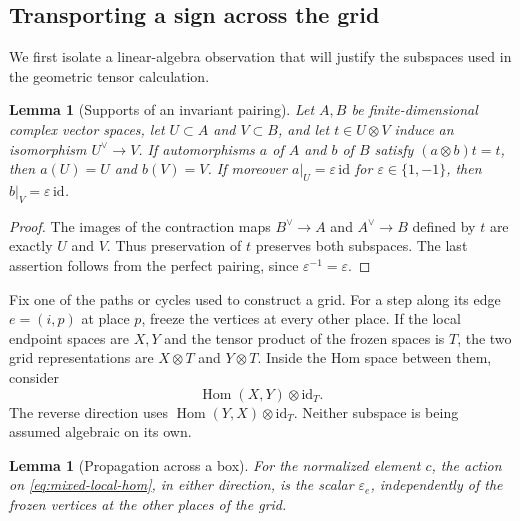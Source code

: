 \documentclass[11pt]{article}
\numberwithin{equation}{section}
\newtheorem{lemma}[theorem]{Lemma}
\theoremstyle{definition}
\theoremstyle{remark}
\DeclareMathOperator{\Hom}{Hom}
\begin{document}
\subsection{Transporting a sign across the grid}

We first isolate a linear-algebra observation that will justify the
subspaces used in the geometric tensor calculation.

\begin{lemma}[Supports of an invariant pairing]\label{lem:mixed-support}
Let $A,B$ be finite-dimensional complex vector spaces, let
$U\subset A$ and $V\subset B$, and let $t\in U\otimes V$ induce
an isomorphism $U^\vee\to V$.  If automorphisms $a$ of $A$ and
$b$ of $B$ satisfy $(a\otimes b)t=t$, then $a(U)=U$ and $b(V)=V$.
If moreover $a|_U=\varepsilon\,\mathrm{id}$ for
$\varepsilon\in\{1,-1\}$, then
$b|_V=\varepsilon\,\mathrm{id}$.
\end{lemma}

\begin{proof}
The images of the contraction maps $B^\vee\to A$ and
$A^\vee\to B$ defined by $t$ are exactly $U$ and $V$.
Thus preservation of $t$ preserves both subspaces.  The last
assertion follows from the perfect pairing, since
$\varepsilon^{-1}=\varepsilon$.
\end{proof}

Fix one of the paths or cycles used to construct a grid.  For a step
along its edge $e=(i,p)$ at place $p$, freeze the vertices at every
other place.  If the local endpoint spaces are $X,Y$ and the tensor
product of the frozen spaces is $T$, the two grid representations are
$X\otimes T$ and $Y\otimes T$.  Inside the Hom space between them,
consider
\begin{equation}\label{eq:mixed-local-hom}
 \Hom(X,Y)\otimes\mathrm{id}_T.
\end{equation}
The reverse direction uses $\Hom(Y,X)\otimes\mathrm{id}_T$.
Neither subspace is being assumed algebraic on its own.

\begin{lemma}[Propagation across a box]\label{lem:mixed-propagation}
For the normalized element $c$, the action on
\eqref{eq:mixed-local-hom}, in either direction, is the scalar
$\varepsilon_e$, independently of the frozen vertices at the
other places of the grid.
\end{lemma}
\end{document}
